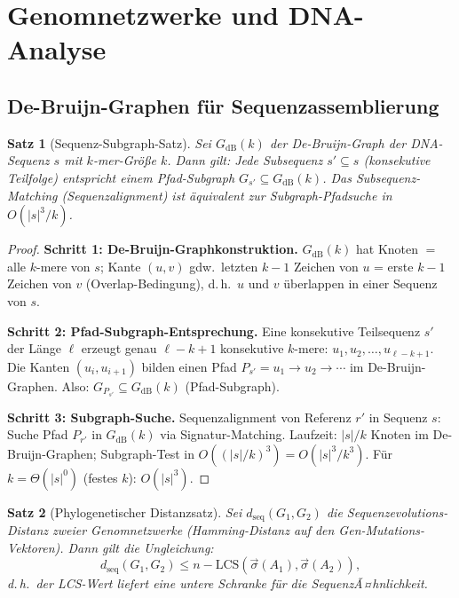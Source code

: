 ﻿\documentclass[a4paper,12pt]{article}
\theoremstyle{plain}
\newtheorem{satz}{Satz}
\theoremstyle{definition}
\theoremstyle{remark}
\newcommand{\sigvec}{\vec{\sigma}}
\begin{document}
\section{Genomnetzwerke und DNA-Analyse}

\subsection{De-Bruijn-Graphen f\"ur Sequenzassemblierung}

\begin{satz}[Sequenz-Subgraph-Satz]
\label{satz:seq_subgraph}
Sei $G_{\mathrm{dB}}(k)$ der De-Bruijn-Graph der DNA-Sequenz $s$ mit
$k$-mer-Gr\"o{\ss}e $k$.
Dann gilt: Jede Subsequenz $s' \subseteq s$ (konsekutive Teilfolge)
entspricht einem Pfad-Subgraph $G_{s'} \subseteq G_{\mathrm{dB}}(k)$.
Das Subsequenz-Matching (Sequenzalignment) ist \"aquivalent zur
Subgraph-Pfadsuche in $O(|s|^3 / k)$.
\end{satz}

\begin{proof}
\textbf{Schritt 1: De-Bruijn-Graphkonstruktion.}
$G_{\mathrm{dB}}(k)$ hat Knoten $= $ alle $k$-mere von $s$;
Kante $(u,v)$ gdw.\ letzten $k-1$ Zeichen von $u$ = erste $k-1$ Zeichen von $v$
(Overlap-Bedingung), d.\,h.\ $u$ und $v$ \"uberlappen in einer Sequenz von $s$.

\textbf{Schritt 2: Pfad-Subgraph-Entsprechung.}
Eine konsekutive Teilsequenz $s'$ der L\"ange $\ell$ erzeugt genau
$\ell - k + 1$ konsekutive $k$-mere: $u_1, u_2, \ldots, u_{\ell-k+1}$.
Die Kanten $(u_i, u_{i+1})$ bilden einen Pfad $P_{s'} = u_1 \to u_2 \to \cdots$
im De-Bruijn-Graphen.
Also: $G_{P_{s'}} \subseteq G_{\mathrm{dB}}(k)$ (Pfad-Subgraph).

\textbf{Schritt 3: Subgraph-Suche.}
Sequenzalignment von Referenz $r'$ in Sequenz $s$:
Suche Pfad $P_{r'}$ in $G_{\mathrm{dB}}(k)$ via Signatur-Matching.
Laufzeit: $|s|/k$ Knoten im De-Bruijn-Graphen;
Subgraph-Test in $O((|s|/k)^3) = O(|s|^3/k^3)$.
F\"ur $k = \Theta(|s|^0)$ (festes $k$): $O(|s|^3)$.
\end{proof}

\begin{satz}[Phylogenetischer Distanzsatz]
\label{satz:phylo_dist}
Sei $d_{\mathrm{seq}}(G_1, G_2)$ die Sequenzevolutions-Distanz zweier
Genomnetzwerke (Hamming-Distanz auf den Gen-Mutations-Vektoren).
Dann gilt die Ungleichung:
\[
d_{\mathrm{seq}}(G_1, G_2) \leq n - \mathrm{LCS}(\sigvec(A_1), \sigvec(A_2)),
\]
d.\,h.\ der LCS-Wert liefert eine untere Schranke f\"ur die SequenzÃ¤hnlichkeit.
\end{satz}
\end{document}
